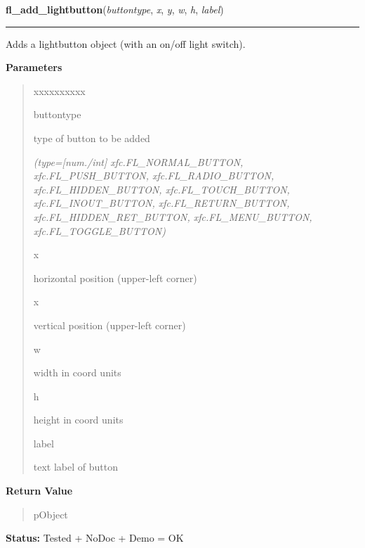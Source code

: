 \hspace{.8\funcindent}\begin{boxedminipage}{\funcwidth}

    \raggedright \textbf{fl\_add\_lightbutton}(\textit{buttontype}, \textit{x}, \textit{y}, \textit{w}, \textit{h}, \textit{label})

    \vspace{-1.5ex}

    \rule{\textwidth}{0.5\fboxrule}
\setlength{\parskip}{2ex}
    Adds a lightbutton object (with an on/off light switch).

\setlength{\parskip}{1ex}
      \textbf{Parameters}
      \vspace{-1ex}

      \begin{quote}
        \begin{Ventry}{xxxxxxxxxx}

          \item[buttontype]

          type of button to be added

            {\it (type=[num./int] xfc.FL\_NORMAL\_BUTTON, xfc.FL\_PUSH\_BUTTON, 
xfc.FL\_RADIO\_BUTTON, xfc.FL\_HIDDEN\_BUTTON, xfc.FL\_TOUCH\_BUTTON, 
xfc.FL\_INOUT\_BUTTON, xfc.FL\_RETURN\_BUTTON, xfc.FL\_HIDDEN\_RET\_BUTTON,
xfc.FL\_MENU\_BUTTON, xfc.FL\_TOGGLE\_BUTTON)}

          \item[x]

          horizontal position (upper-left corner)

          \item[x]

          vertical position (upper-left corner)

          \item[w]

          width in coord units

          \item[h]

          height in coord units

          \item[label]

          text label of button

        \end{Ventry}

      \end{quote}

      \textbf{Return Value}
    \vspace{-1ex}

      \begin{quote}
      pObject

      \end{quote}

\textbf{Status:} Tested + NoDoc + Demo = OK



    \end{boxedminipage}

